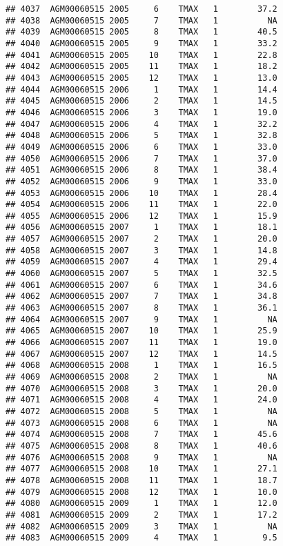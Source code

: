 \documentclass{article}\usepackage[]{graphicx}\usepackage[]{color}
\makeatletter
\newenvironment{kframe}{%
 \def\at@end@of@kframe{}%
 \ifinner\ifhmode%
  \def\at@end@of@kframe{\end{minipage}}%
  \begin{minipage}{\columnwidth}%
 \fi\fi%
 \def\FrameCommand##1{\hskip\@totalleftmargin \hskip-\fboxsep
 \colorbox{shadecolor}{##1}\hskip-\fboxsep
     \hskip-\linewidth \hskip-\@totalleftmargin \hskip\columnwidth}%
 \MakeFramed {\advance\hsize-\width
   \@totalleftmargin\z@ \linewidth\hsize
   \@setminipage}}%
 {\par\unskip\endMakeFramed%
 \at@end@of@kframe}
\newenvironment{knitrout}{}{} %
\makeatother
\begin{document}
\begin{knitrout}
\begin{kframe}
\begin{verbatim}
## 4037  AGM00060515 2005     6    TMAX   1        37.2
## 4038  AGM00060515 2005     7    TMAX   1          NA
## 4039  AGM00060515 2005     8    TMAX   1        40.5
## 4040  AGM00060515 2005     9    TMAX   1        33.2
## 4041  AGM00060515 2005    10    TMAX   1        22.8
## 4042  AGM00060515 2005    11    TMAX   1        18.2
## 4043  AGM00060515 2005    12    TMAX   1        13.0
## 4044  AGM00060515 2006     1    TMAX   1        14.4
## 4045  AGM00060515 2006     2    TMAX   1        14.5
## 4046  AGM00060515 2006     3    TMAX   1        19.0
## 4047  AGM00060515 2006     4    TMAX   1        32.2
## 4048  AGM00060515 2006     5    TMAX   1        32.8
## 4049  AGM00060515 2006     6    TMAX   1        33.0
## 4050  AGM00060515 2006     7    TMAX   1        37.0
## 4051  AGM00060515 2006     8    TMAX   1        38.4
## 4052  AGM00060515 2006     9    TMAX   1        33.0
## 4053  AGM00060515 2006    10    TMAX   1        28.4
## 4054  AGM00060515 2006    11    TMAX   1        22.0
## 4055  AGM00060515 2006    12    TMAX   1        15.9
## 4056  AGM00060515 2007     1    TMAX   1        18.1
## 4057  AGM00060515 2007     2    TMAX   1        20.0
## 4058  AGM00060515 2007     3    TMAX   1        14.8
## 4059  AGM00060515 2007     4    TMAX   1        29.4
## 4060  AGM00060515 2007     5    TMAX   1        32.5
## 4061  AGM00060515 2007     6    TMAX   1        34.6
## 4062  AGM00060515 2007     7    TMAX   1        34.8
## 4063  AGM00060515 2007     8    TMAX   1        36.1
## 4064  AGM00060515 2007     9    TMAX   1          NA
## 4065  AGM00060515 2007    10    TMAX   1        25.9
## 4066  AGM00060515 2007    11    TMAX   1        19.0
## 4067  AGM00060515 2007    12    TMAX   1        14.5
## 4068  AGM00060515 2008     1    TMAX   1        16.5
## 4069  AGM00060515 2008     2    TMAX   1          NA
## 4070  AGM00060515 2008     3    TMAX   1        20.0
## 4071  AGM00060515 2008     4    TMAX   1        24.0
## 4072  AGM00060515 2008     5    TMAX   1          NA
## 4073  AGM00060515 2008     6    TMAX   1          NA
## 4074  AGM00060515 2008     7    TMAX   1        45.6
## 4075  AGM00060515 2008     8    TMAX   1        40.6
## 4076  AGM00060515 2008     9    TMAX   1          NA
## 4077  AGM00060515 2008    10    TMAX   1        27.1
## 4078  AGM00060515 2008    11    TMAX   1        18.7
## 4079  AGM00060515 2008    12    TMAX   1        10.0
## 4080  AGM00060515 2009     1    TMAX   1        12.0
## 4081  AGM00060515 2009     2    TMAX   1        17.2
## 4082  AGM00060515 2009     3    TMAX   1          NA
## 4083  AGM00060515 2009     4    TMAX   1         9.5

\end{verbatim}
\end{kframe}
\end{knitrout}
\end{document}
